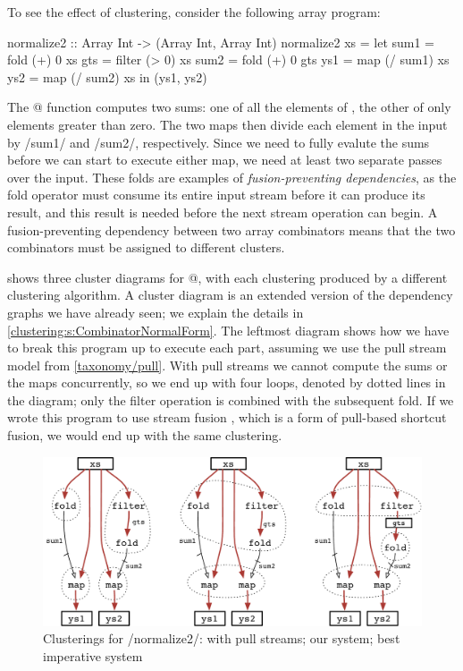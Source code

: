 To see the effect of clustering, consider the following array program:

\begin{haskell}
normalize2 :: Array Int -> (Array Int, Array Int)
normalize2 xs
 = let sum1 = fold   (+)  0   xs
       gts  = filter (>   0)  xs
       sum2 = fold   (+)  0   gts
       ys1  = map    (/ sum1) xs
       ys2  = map    (/ sum2) xs
   in (ys1, ys2)
\end{haskell}

The @ function computes two sums: one of all the elements of \Hs@xs@, the other of only elements greater than zero.
The two maps then divide each element in the input \Hs@xs@ by \Hs/sum1/ and \Hs/sum2/, respectively.
Since we need to fully evalute the sums before we can start to execute either map, we need at least two separate passes over the input.
These folds are examples of \emph{fusion-preventing dependencies}, as the fold operator must consume its entire input stream before it can produce its result, and this result is needed before the next stream operation can begin.
A fusion-preventing dependency between two array combinators means that the two combinators must be assigned to different clusters.

 shows three cluster diagrams for @, with each clustering produced by a different clustering algorithm.
A cluster diagram is an extended version of the dependency graphs we have already seen; we explain the details in \cref{clustering:s:CombinatorNormalForm}.
The leftmost diagram shows how we have to break this program up to execute each part, assuming we use the pull stream model from \cref{taxonomy/pull}.
With pull streams we cannot compute the sums or the maps concurrently, so we end up with four loops, denoted by dotted lines in the diagram; only the filter operation is combined with the subsequent fold.
If we wrote this program to use stream fusion \citep{coutts2007stream}, which is a form of pull-based shortcut fusion, we would end up with the same clustering.

\begin{figure}
\begin{center}
\includegraphics[scale=0.7]{copy/03-body/clustering/figures/ex1-compare.pdf}
\end{center}
\caption{Clusterings for \Hs/normalize2/: with pull streams; our system; best imperative system}
\label{clustering:f:normalize2-clusterings}
\end{figure}


